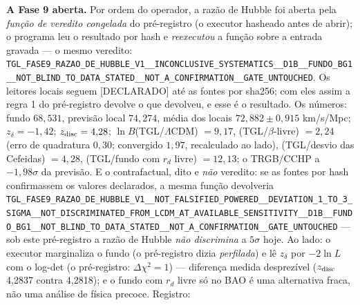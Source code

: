 \documentclass[11pt]{article}
\theoremstyle{definition}\newtheorem{deriv}{Derivação}
\begin{document}
\textbf{A Fase 9 aberta.} Por ordem do operador, a razão de Hubble foi aberta pela \emph{função de veredito congelada} do pré-registro (o executor hasheado antes de abrir); o programa leu o resultado por hash e \emph{reexecutou} a função sobre a entrada gravada --- o mesmo veredito: \texttt{TGL\_\allowbreak{}FASE9\_\allowbreak{}RAZAO\_\allowbreak{}DE\_\allowbreak{}HUBBLE\_\allowbreak{}V1\_\allowbreak{}\_\allowbreak{}INCONCLUSIVE\_\allowbreak{}SYSTEMATICS\_\allowbreak{}\_\allowbreak{}D1B\_\allowbreak{}\_\allowbreak{}FUNDO\_\allowbreak{}BG1\_\allowbreak{}\_\allowbreak{}NOT\_\allowbreak{}BLIND\_\allowbreak{}TO\_\allowbreak{}DATA\_\allowbreak{}STATED\_\allowbreak{}\_\allowbreak{}NOT\_\allowbreak{}A\_\allowbreak{}CONFIRMATION\_\allowbreak{}\_\allowbreak{}GATE\_\allowbreak{}UNTOUCHED}. Os leitores locais seguem \textsf{[DECLARADO]} até as fontes por sha256; com eles assim a regra 1 do pré-registro devolve o que devolveu, e esse é o resultado. Os números: fundo $68{,}531$, previsão local $74{,}274$, média dos locais $72{,}882\pm0{,}915$ km/s/Mpc; $z_\delta=-1{,}42$; $z_{\rm disc}=4{,}28$; $\ln B$(TGL/$\Lambda$CDM) $=9{,}17$, (TGL/$\beta$-livre) $=2{,}24$ (erro de quadratura $0{,}30$; convergido $1{,}97$, recalculado ao lado), (TGL/desvio das Cefeidas) $=4{,}28$, (TGL/fundo com $r_d$ livre) $=12{,}13$; o TRGB/CCHP a $-1{,}98\sigma$ da previsão. E o contrafactual, dito e \emph{não} veredito: se as fontes por hash confirmassem os valores declarados, a mesma função devolveria \texttt{TGL\_\allowbreak{}FASE9\_\allowbreak{}RAZAO\_\allowbreak{}DE\_\allowbreak{}HUBBLE\_\allowbreak{}V1\_\allowbreak{}\_\allowbreak{}NOT\_\allowbreak{}FALSIFIED\_\allowbreak{}POWERED\_\allowbreak{}\_\allowbreak{}DEVIATION\_\allowbreak{}1\_\allowbreak{}TO\_\allowbreak{}3\_\allowbreak{}SIGMA\_\allowbreak{}\_\allowbreak{}NOT\_\allowbreak{}DISCRIMINATED\_\allowbreak{}FROM\_\allowbreak{}LCDM\_\allowbreak{}AT\_\allowbreak{}AVAILABLE\_\allowbreak{}SENSITIVITY\_\allowbreak{}\_\allowbreak{}D1B\_\allowbreak{}\_\allowbreak{}FUNDO\_\allowbreak{}BG1\_\allowbreak{}\_\allowbreak{}NOT\_\allowbreak{}BLIND\_\allowbreak{}TO\_\allowbreak{}DATA\_\allowbreak{}STATED\_\allowbreak{}\_\allowbreak{}NOT\_\allowbreak{}A\_\allowbreak{}CONFIRMATION\_\allowbreak{}\_\allowbreak{}GATE\_\allowbreak{}UNTOUCHED} --- sob este pré-registro a razão de Hubble \emph{não discrimina} a $5\sigma$ hoje. Ao lado: o executor marginaliza o fundo (o pré-registro dizia \emph{perfilada}) e lê $z_\delta$ por $-2\ln L$ com o log-det (o pré-registro: $\Delta\chi^2=1$) --- diferença medida desprezível ($z_{\rm disc}$ 4{,}2837 contra 4{,}2818); e o fundo com $r_d$ livre só no BAO é uma alternativa fraca, não uma análise de física precoce. Registro: 
\end{document}
